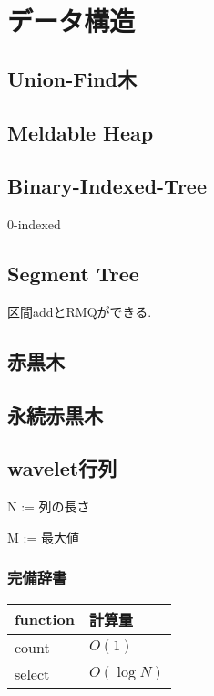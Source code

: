 \section{データ構造}
\subsection{Union-Find木}


\subsection{Meldable Heap}


\subsection{Binary-Indexed-Tree}
0-indexed

\subsection{Segment Tree}
区間addとRMQができる.

\subsection{赤黒木}

\subsection{永続赤黒木}

\subsection{wavelet行列}
N := 列の長さ\par
M := 最大値\\
\subsubsection{完備辞書}
\begin{table} [htb]
  \begin{tabular} { |l|l| } \hline
    function & 計算量 \\ \hline
    count & $O(1)$ \\ \hline
    select & $O(\log N)$ \\ \hline
  \end{tabular}
\end{table}

